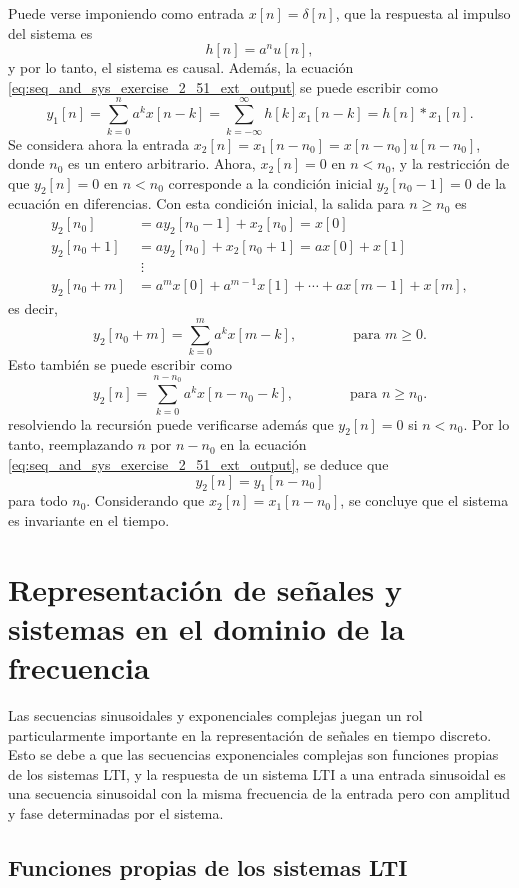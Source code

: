 \documentclass[a4paper]{report}
\begin{document}
Puede verse imponiendo como entrada \(x[n]=\delta[n]\), que la respuesta al impulso del sistema es
\[
 h[n]=a^nu[n],
\]
y por lo tanto, el sistema es causal. Además, la ecuación \ref{eq:seq_and_sys_exercise_2_51_ext_output} se puede escribir como
\[
 y_1[n]=\sum_{k=0}^{n}a^kx[n-k]=\sum_{k=-\infty}^\infty h[k]x_1[n-k]=h[n]*x_1[n].
\]
Se considera ahora la entrada \(x_2[n]=x_1[n-n_0]=x[n-n_0]u[n-n_0]\), donde \(n_0\) es un entero arbitrario. Ahora, \(x_2[n]=0\) en \(n<n_0\), y la restricción de que \(y_2[n]=0\) en \(n<n_0\) corresponde a la condición inicial \(y_2[n_0-1]=0\) de la ecuación en diferencias. Con esta condición inicial, la salida para \(n\geq n_0\) es
\begin{align*}
  y_2[n_0]&=ay_2[n_0-1]+x_2[n_0]=x[0]\\
  y_2[n_0+1]&=ay_2[n_0]+x_2[n_0+1]=ax[0]+x[1]\\
  &\;\vdots\\
  y_2[n_0+m]&=a^{m}x[0]+a^{m-1}x[1]+\cdots+ax[m-1]+x[m],
\end{align*}
es decir,
\[
 y_2[n_0+m]=\sum_{k=0}^{m}a^kx[m-k],
 \qquad\qquad\textrm{para }m\geq0. 
\]
Esto también se puede escribir como
\[
 y_2[n]=\sum_{k=0}^{n-n_0}a^kx[n-n_0-k],
 \qquad\qquad\textrm{para }n\geq n_0.
\]
resolviendo la recursión puede verificarse además que \(y_2[n]=0\) si \(n<n_0\). Por lo tanto, reemplazando \(n\) por \(n-n_0\) en la ecuación \ref{eq:seq_and_sys_exercise_2_51_ext_output}, se deduce que 
\[
 y_2[n]=y_1[n-n_0]
\]
para todo \(n_0\). Considerando que \(x_2[n]=x_1[n-n_0]\), se concluye que el sistema es invariante en el tiempo.
 
\section{Representación de señales y sistemas en el dominio de la frecuencia}\label{sec:seq_and_sys_frequency_domain_representation} 
 
Las secuencias sinusoidales y exponenciales complejas juegan un rol particularmente importante en la representación de señales en tiempo discreto. Esto se debe a que las secuencias exponenciales complejas son funciones propias de los sistemas LTI, y la respuesta de un sistema LTI a una entrada sinusoidal es una secuencia sinusoidal con la misma frecuencia de la entrada pero con amplitud y fase determinadas por el sistema.
 
\subsection{Funciones propias de los sistemas LTI} 
\end{document}
